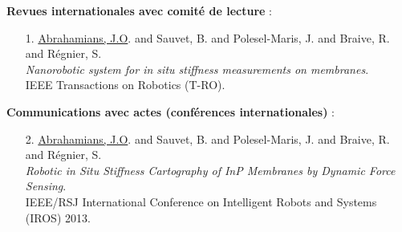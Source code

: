 
\vspace*{-1cm}
\textbf{Revues internationales avec comité de lecture} :
\begin{enumerate}

\item[1.] 	\underline{Abrahamians, J.O}. and Sauvet, B. and Polesel-Maris, J. and Braive, R. and Régnier, S. \\ 
 \textit{Nanorobotic system for in situ stiffness
measurements on membranes}. \\
IEEE Transactions on Robotics (T-RO).%


\end{enumerate}

\textbf{Communications avec actes (conférences internationales)} :
\begin{enumerate}

\item[2.] 	\underline{Abrahamians, J.O}. and Sauvet, B. and Polesel-Maris, J. and Braive, R. and Régnier, S. \\ 
 \textit{Robotic in Situ Stiffness Cartography of InP Membranes by Dynamic Force Sensing}. \\ 
IEEE/RSJ International Conference on Intelligent Robots and Systems (IROS) 2013.\\


\end{enumerate}